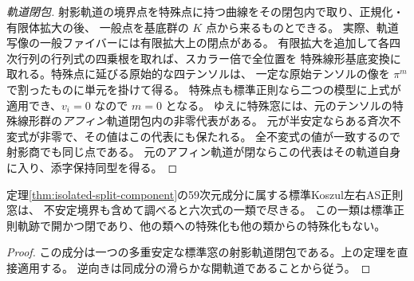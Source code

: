 \begin{proof}[軌道閉包]
射影軌道の境界点を特殊点に持つ曲線をその閉包内で取り、正規化・有限体拡大の後、
一般点を基底群の $K$ 点から来るものとできる。
実際、軌道写像の一般ファイバーには有限拡大上の閉点がある。
有限拡大を追加して各四次行列の行列式の四乗根を取れば、スカラー倍で全位置を
特殊線形基底変換に取れる。特殊点に延びる原始的な四テンソルは、
一定な原始テンソルの像を $\pi^m$ で割ったものに単元を掛けて得る。
特殊点も標準正則なら二つの模型に上式が適用でき、$v_i=0$ なので $m=0$ となる。
ゆえに特殊窓には、元のテンソルの特殊線形群の\emph{アフィン}軌道閉包内の非零代表がある。
元が半安定ならある斉次不変式が非零で、その値はこの代表にも保たれる。
全不変式の値が一致するので射影商でも同じ点である。
元のアフィン軌道が閉ならこの代表はその軌道自身に入り、添字保持同型を得る。
\end{proof}

\begin{corollary}\label{cor:isolated-split-component-all-regular}
定理\ref{thm:isolated-split-component}の59次元成分に属する標準Koszul左右AS正則窓は、
不安定境界も含めて調べると六次式の一類で尽きる。
この一類は標準正則軌跡で開かつ閉であり、他の類への特殊化も他の類からの特殊化もない。
\end{corollary}
\begin{proof}
この成分は一つの多重安定な標準窓の射影軌道閉包である。上の定理を直接適用する。
逆向きは同成分の滑らかな開軌道であることから従う。
\end{proof}
